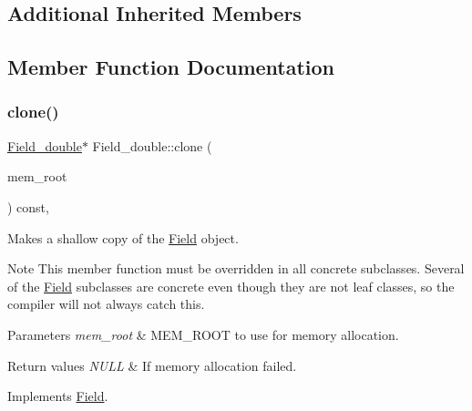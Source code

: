 \subsection*{Additional Inherited Members}


\subsection{Member Function Documentation}
\mbox{\label{classField__double_aaad7ee85ba4751cb63c772d66bf47075}} 
\subsubsection{\texorpdfstring{clone()}{clone()}\hspace{0.1cm}{\footnotesize\ttfamily [1/2]}}
{\footnotesize\ttfamily \mbox{\hyperlink{classField__double}{Field\+\_\+double}}$\ast$ Field\+\_\+double\+::clone (\begin{DoxyParamCaption}\item[{M\+E\+M\+\_\+\+R\+O\+OT $\ast$}]{mem\+\_\+root }\end{DoxyParamCaption}) const\hspace{0.3cm}{\ttfamily [inline]}, {\ttfamily [virtual]}}

Makes a shallow copy of the \mbox{\hyperlink{classField}{Field}} object.

\begin{DoxyNote}{Note}
This member function must be overridden in all concrete subclasses. Several of the \mbox{\hyperlink{classField}{Field}} subclasses are concrete even though they are not leaf classes, so the compiler will not always catch this.
\end{DoxyNote}

\begin{DoxyParams}{Parameters}
{\em mem\+\_\+root} & M\+E\+M\+\_\+\+R\+O\+OT to use for memory allocation. \\
\hline
\end{DoxyParams}

\begin{DoxyRetVals}{Return values}
{\em N\+U\+LL} & If memory allocation failed. \\
\hline
\end{DoxyRetVals}


Implements \mbox{\hyperlink{classField_a64979bcb9345803b031fff76a0c3d9fe}{Field}}.

